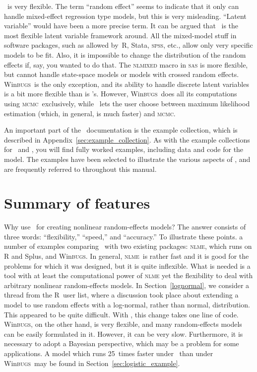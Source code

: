 \documentclass{admbmanual}
\newcommand{\scMCMC}{\textsc{mcmc}}
\newcommand{\scNLME}{\textsc{nlme}}
\newcommand{\scWinBUGS}{Win\textsc{bugs}}
\begin{document}
\scAR\ is very flexible. The term ``random effect'' seems to indicate that it only can handle mixed-effect
regression type models, but this is very misleading. ``Latent variable'' would have
been a more precise term. It can be argued that \scAR\ is the most flexible latent variable framework around.
All the mixed-model stuff in software packages, such as allowed by~R, Stata, \textsc{spss}, etc., allow only very specific models
to be fit.  Also, it is impossible to change the distribution of the random effects if, say, you wanted to do that.
The \textsc{nlmixed} macro in \textsc{sas} is more flexible, but cannot handle state-space models or models with crossed
random effects. \scWinBUGS\ is the only exception, and its ability to handle discrete
latent variables is a bit more flexible than is \scAR's. However, \scWinBUGS\ does all its computations using \scMCMC\ exclusively,
while \scAR\ lets the user choose between maximum likelihood estimation (which, in general, is much faster) and \scMCMC.

An important part of the \scAR\ documentation is the example collection, which is described in Appendix~\ref{sec:example_collection}.
As with the example collections for \scAB\ and \scAD, you will find fully worked examples, including data and code for the model. 
The examples have been selected to illustrate the various aspects of \scAR, and are frequently referred to throughout this manual.

\section{Summary of features}

Why use \ADM\ for creating nonlinear random-effects models? The answer consists of three words:
``flexibility,'' ``speed,'' and ``accuracy.'' To illustrate these points. a number of examples comparing \scAR\ with two
existing packages:  \textsc{nlme}, which runs on R and Splus, and \scWinBUGS. In general, \scNLME\ is rather fast and it is good for
the problems for which it was designed, but it is quite inflexible. What is needed is a tool with at least the
computational power of \textsc{nlme} yet the flexibility to deal with arbitrary nonlinear random-effects models. In
Section~\ref{lognormal}, we consider a thread from the R~user list, where a discussion took place about extending a model to
use random effects with a log-normal, rather than normal, distribution. This appeared to be quite
difficult. With \scAR, this change takes one line of code. \scWinBUGS, on the other hand, is very flexible, and many
random-effects models can be easily formulated in it. However, it can be very slow.  Furthermore, it is necessary to adopt
a Bayesian perspective, which may be a problem for some applications. 
A model which runs 25~times faster under \scAB\ than under \scWinBUGS\ may be found in Section~\ref{sec:logistic_example}.
\end{document}
